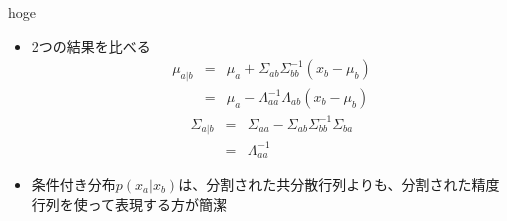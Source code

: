 \begin{frame}{hoge}
 \begin{itemize}
	\item 2つの結果を比べる
				\begin{eqnarray*}
				 \mu_{a|b} &=& \mu_a + \Sigma_{ab}\Sigma_{bb}^{-1}(x_b-\mu_b)\\
				 &=& \mu_a-\Lambda_{aa}^{-1}\Lambda_{ab}(x_b-\mu_b)
				\end{eqnarray*}
			 \begin{eqnarray*}
				\Sigma_{a|b} &=& \Sigma_{aa} - \Sigma_{ab}\Sigma_{bb}^{-1}\Sigma_{ba} \\
& =& \Lambda_{aa}^{-1}
			 \end{eqnarray*}
 \item 条件付き分布$p(x_a|x_b)$は、分割された共分散行列よりも、分割された精度行列を使って表現する方が簡潔
 \end{itemize}
\end{frame}


